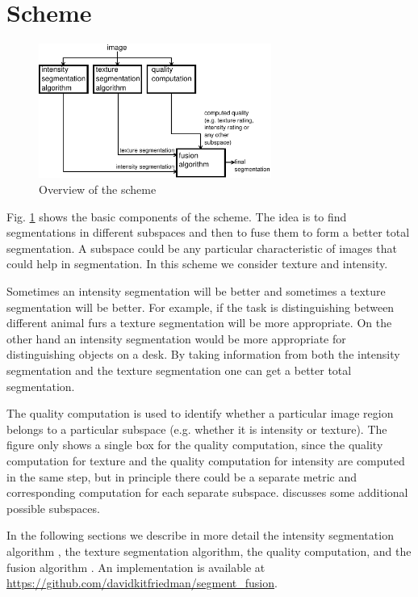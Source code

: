 \documentclass[twocolumn]{article}
\begin{document}
\section{Scheme}


\begin{figure}[!t]
\centering
\includegraphics[width=3in]{overview}
\caption{Overview of the scheme}
\label{fig:overview}
\end{figure}


Fig. \ref{fig:overview} shows the basic components of the scheme. The
idea is to find segmentations in different subspaces and then to fuse
them to form a better total segmentation. A subspace could be any
particular characteristic of images that could help in
segmentation. In this scheme we consider texture and intensity. 


Sometimes an intensity segmentation will be better and sometimes
a texture segmentation will be better. For example, if the 
task is distinguishing between different animal furs a texture
segmentation will be more appropriate. On the other hand an intensity
segmentation would be more appropriate for distinguishing objects on a
desk. By taking information from both the intensity
segmentation and the texture segmentation one can get a
better total segmentation.

The quality computation is used to identify whether a particular image
region belongs to a particular subspace (e.g. whether it is intensity
or texture). The figure only shows a single box for the quality
computation, since the quality computation for texture and the quality
computation for intensity are computed in the same step, but in
principle there could be a separate metric and corresponding
computation for each separate subspace. \cite{prev} discusses some
additional possible subspaces. 

In the following sections we describe in more detail the
intensity segmentation algorithm \cite{intensity}, the texture
segmentation algorithm, the quality computation, and the
fusion algorithm \cite{fusion1}. An implementation is available at \url{https://github.com/davidkitfriedman/segment_fusion}. 
\end{document}
